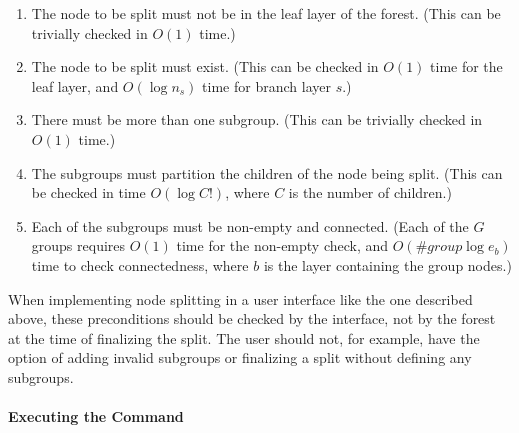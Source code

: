 \begin{enumerate}

\item The node to be split must not be in the leaf layer of the forest. (This can be trivially checked in $O(1)$ time.)
\item The node to be split must exist. (This can be checked in $O(1)$ time for the leaf layer, and $O(\log n_s)$ time for branch layer $s$.)
\item There must be more than one subgroup. (This can be trivially checked in $O(1)$ time.)
\item The subgroups must partition the children of the node being split. (This can be checked in time $O(\log C!)$, where $C$ is the number of children.)
\item Each of the subgroups must be non-empty and connected. (Each of the $G$ groups requires $O(1)$ time for the non-empty check, and $O(\#\mathit{group} \log e_b)$ time to check connectedness, where $b$ is the layer containing the group nodes.)

\end{enumerate}

When implementing node splitting in a user interface like the one described above, these preconditions should be checked by the interface, not by the forest at the time of finalizing the split. The user should not, for example, have the option of adding invalid subgroups or finalizing a split without defining any subgroups.

\paragraph{Executing the Command}

